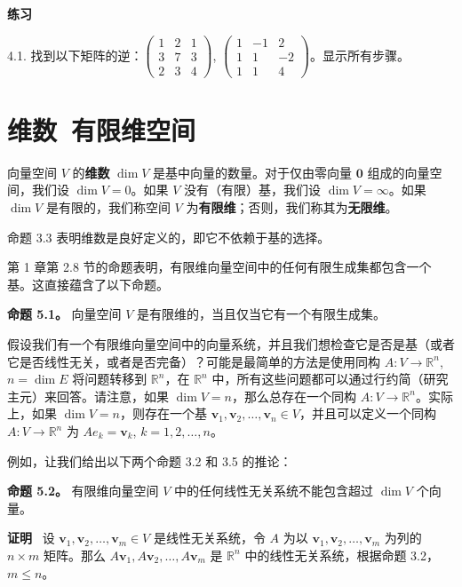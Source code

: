 \textbf{练习}~

4.1. 找到以下矩阵的逆：$\begin{pmatrix} 1 & 2 & 1 \\ 3 & 7 & 3 \\ 2 & 3 & 4 \end{pmatrix}$, $\begin{pmatrix} 1 & -1 & 2 \\ 1 & 1 & -2 \\ 1 & 1 & 4 \end{pmatrix}$。显示所有步骤。


\section{维数~有限维空间}

\begin{definition} 向量空间 $V$ 的\textbf{维数} $\dim V$ 是基中向量的数量。对于仅由零向量 $\mathbf{0}$ 组成的向量空间，我们设 $\dim V = 0$。如果 $V$ 没有（有限）基，我们设 $\dim V = \infty$。如果 $\dim V$ 是有限的，我们称空间 $V$ 为\textbf{有限维}；否则，我们称其为\textbf{无限维}。
\end{definition}

命题 3.3 表明维数是良好定义的，即它不依赖于基的选择。

第 1 章第 2.8 节的命题表明，有限维向量空间中的任何有限生成集都包含一个基。这直接蕴含了以下命题。

\textbf{命题 5.1。} 向量空间 $V$ 是有限维的，当且仅当它有一个有限生成集。

假设我们有一个有限维向量空间中的向量系统，并且我们想检查它是否是基（或者它是否线性无关，或者是否完备）？可能是最简单的方法是使用同构 $A: V \to \mathbb{R}^n$, $n = \dim E$ 将问题转移到 $\mathbb{R}^n$，在 $\mathbb{R}^n$ 中，所有这些问题都可以通过行约简（研究主元）来回答。请注意，如果 $\dim V = n$，那么总存在一个同构 $A: V \to \mathbb{R}^n$。实际上，如果 $\dim V = n$，则存在一个基 $\mathbf{v}_1, \mathbf{v}_2, \dots, \mathbf{v}_n \in V$，并且可以定义一个同构 $A: V \to \mathbb{R}^n$ 为 $A e_k = \mathbf{v}_k$, $k = 1, 2, \dots, n$。

例如，让我们给出以下两个命题 3.2 和 3.5 的推论：

\textbf{命题 5.2。} 有限维向量空间 $V$ 中的任何线性无关系统不能包含超过 $\dim V$ 个向量。

\textbf{证明}~ 设 $\mathbf{v}_1, \mathbf{v}_2, \dots, \mathbf{v}_m \in V$ 是线性无关系统，令 $A$ 为以 $\mathbf{v}_1, \mathbf{v}_2, \dots, \mathbf{v}_m$ 为列的 $n \times m$ 矩阵。那么 $A \mathbf{v}_1, A \mathbf{v}_2, \dots, A \mathbf{v}_m$ 是 $\mathbb{R}^n$ 中的线性无关系统，根据命题 3.2， $m \le n$。

